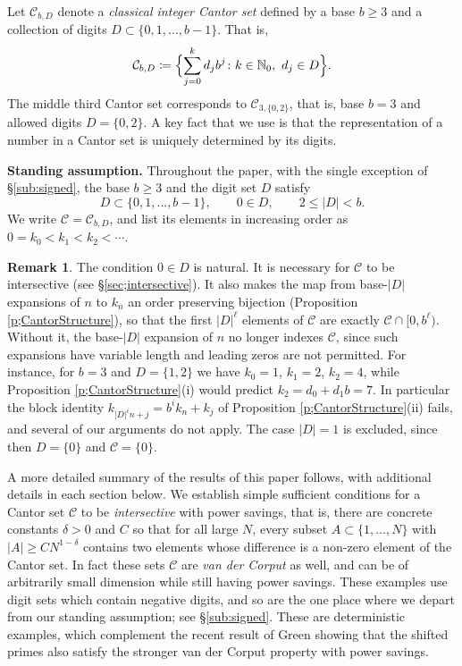 \documentclass[12pt]{amsart}
\numberwithin{equation}{section}
\theoremstyle{definition}
\newtheorem{remark}[equation]{Remark}
\begin{document}
Let $\mathcal{C}_{b,D}$ denote a \emph{classical integer Cantor set} defined by a base $b\geq 3$ 
and a collection of digits 
$ D \subset \{0,1,\ldots,b-1\}$. 
That is, 
\begin{equation}
\mathcal{C}_{b, D}  \coloneqq 
\Bigl\{ 
 \sum_{j=0}^k d_j b ^{j} 
 \colon  k\in \mathbb{N}_0 ,\ d_j \in  D
\Bigr\}.
\end{equation}
The middle third Cantor set corresponds to $\mathcal{C}_{3,\{ 0, 2 \}}$, that is, base $b=3$  
and allowed digits $D= \{0,2\}$.  
A key fact that we use is that the representation of a number in a Cantor set is uniquely determined by its digits.

\smallskip 
\noindent\textbf{Standing assumption.} 
Throughout the paper, with the single exception of \S\ref{sub:signed}, the base $b\geq 3$ and the digit set $D$ satisfy 
\begin{equation}\label{e:standing}
D\subset \{0,1,\ldots ,b-1\}, \qquad 0\in D, \qquad 2\leq \lvert D\rvert <b. 
\end{equation}
We write $\mathcal C = \mathcal C_{b,D}$, and list its elements in increasing order as $0=k_0<k_1<k_2<\cdots$. 

\begin{remark} 
The condition $0\in D$ is natural. It is necessary for $\mathcal C$ to be intersective (see \S\ref{sec;intersective}). 
It also makes the map from base-$\lvert D\rvert$ expansions of $n$ to $k_n$ an order preserving bijection (Proposition \ref{p;CantorStructure}), 
so that the first $\lvert D\rvert^\ell$ elements of $\mathcal C$ are exactly $\mathcal C\cap[0,b^\ell)$. 
Without it, the base-$\lvert D\rvert$ expansion of $n$ no longer indexes $\mathcal C$, since such expansions have variable length and leading zeros are not permitted.
For instance, for $b=3$ and $D=\{1,2\}$ we have $k_0=1$, $k_1=2$, $k_2=4$, while Proposition \ref{p;CantorStructure}(i) would predict $k_2=d_0+d_1b=7$.
In particular the block identity $k_{\lvert D\rvert^in+j}=b^ik_n+k_j$ of Proposition \ref{p;CantorStructure}(ii) fails, and several of our arguments do not apply. 
The case $\lvert D \rvert=1$ is excluded, since then $D=\{0\}$ and $\mathcal{C}=\{0\}$. 
\end{remark}
  

A more detailed summary of the results of this paper follows, with additional details in each section below.    
We establish simple sufficient conditions for a Cantor set $\mathcal C$ to be \emph{intersective} with power savings, that is, there are concrete constants $\delta >0$ and $C$ so that for all large $N$, every subset $A\subset \{1, \ldots, N\}$ with $\lvert A\rvert \geq CN^{1- \delta }$ contains two elements whose difference is a non-zero element of the Cantor set. 
In fact these sets $\mathcal C$ are \emph{van der Corput} as well, and can be of arbitrarily small dimension while still having power savings. 
These examples use digit sets which contain negative digits, and so are the one place where we depart from our standing assumption; see \S\ref{sub:signed}.  These are deterministic examples, which complement the recent result of Green \cite{green2023sarkozystheoremshiftedprimes} showing that the shifted primes also satisfy the stronger van der Corput property with power savings.  
\end{document}
